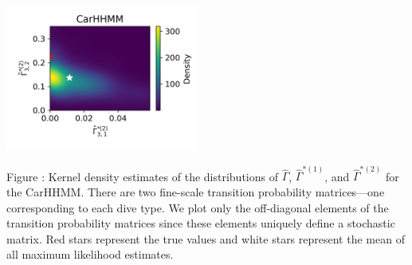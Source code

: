 \documentclass{article}
\begin{document}
\begin{center}
        \includegraphics[width=2.5in]{../Plots/hhmm_V_Gamma_density_1_row_2.png}
        \end{center}
        
        \noindent Figure : Kernel density estimates of the distributions of $\hat \Gamma$, $\hat \Gamma^{*(1)}$, and $\hat \Gamma^{*(2)}$ for the CarHHMM. There are two fine-scale transition probability matrices---one corresponding to each dive type. We plot only the off-diagonal elements of the transition probability matrices since these elements uniquely define a stochastic matrix. Red stars represent the true values and white stars represent the mean of all maximum likelihood estimates.
        \addtocounter{fignum}{1}
        
        \newpage
\end{document}
